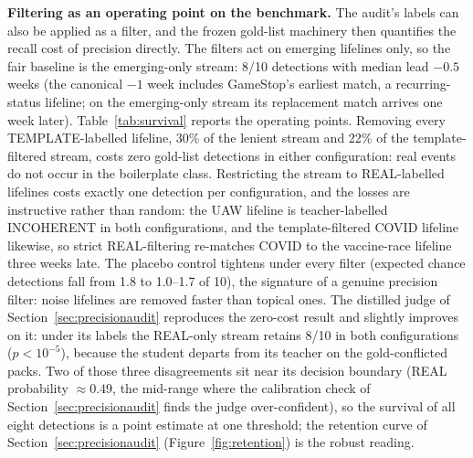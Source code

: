 \documentclass[a4paper,12pt]{report}
\begin{document}
\textbf{Filtering as an operating point on the benchmark.} The audit's
labels can also be applied as a filter, and the frozen gold-list
machinery then quantifies the recall cost of precision directly. The
filters act on emerging lifelines only, so the fair baseline is the
emerging-only stream: 8/10 detections with median lead $-0.5$ weeks
(the canonical $-1$ week includes GameStop's earliest match, a
recurring-status lifeline; on the emerging-only stream its replacement
match arrives one week later). Table~\ref{tab:survival} reports the
operating points. Removing every TEMPLATE-labelled lifeline, 30\% of
the lenient stream and 22\% of the template-filtered stream, costs
zero gold-list detections in either configuration: real events
do not occur in the boilerplate class. Restricting the stream to
REAL-labelled lifelines costs exactly one detection per configuration,
and the losses are instructive rather than random: the UAW lifeline is
teacher-labelled INCOHERENT in both configurations, and the
template-filtered COVID lifeline likewise, so strict REAL-filtering
re-matches COVID to the vaccine-race lifeline three weeks late. The
placebo control tightens under every filter (expected chance detections
fall from 1.8 to 1.0--1.7 of 10), the signature of a genuine precision
filter: noise lifelines are removed faster than topical ones. The
distilled judge of Section~\ref{sec:precisionaudit} reproduces the
zero-cost result and slightly improves on it: under its labels the REAL-only
stream retains 8/10 in both configurations ($p < 10^{-5}$), because
the student departs from its teacher on the gold-conflicted
packs. Two of those three disagreements sit near its decision boundary
(REAL probability $\approx 0.49$, the mid-range where the calibration
check of Section~\ref{sec:precisionaudit} finds the judge
over-confident), so the survival of all eight
detections is a point estimate at one threshold; the retention curve of
Section~\ref{sec:precisionaudit} (Figure~\ref{fig:retention}) is the
robust reading.
\end{document}
